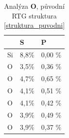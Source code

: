 \documentclass[
  digital, %
  table,   %
  lof,     %
  lot,     %
  oneside,
]{fithesis3}
\begin{document}
\begin{table}[htbp]
\caption{Analýza \textbf{O}, původní RTG struktura \ref{struktura_puvodni}}
\begin{center}
\begin{tabular}{|l|r|r|}
\hline
 & \multicolumn{1}{l|}{S} & \multicolumn{1}{l|}{P} \\ \hline
Si & 8,8\% & 0,00 \% \\ \hline
O & 3,5\% & 0,36 \% \\ \hline
O & 4,7\% & 0,65 \% \\ \hline
O & 4,1\% & 0,51 \% \\ \hline
O & 4,1\% & 0,42 \% \\ \hline
O & 3,9\% & 0,49 \% \\ \hline
O & 3,9\% & 0,37 \% \\ \hline
\end{tabular}
\end{center}
\label{struktura_puvodni_MPA}
\end{table}
\end{document}
